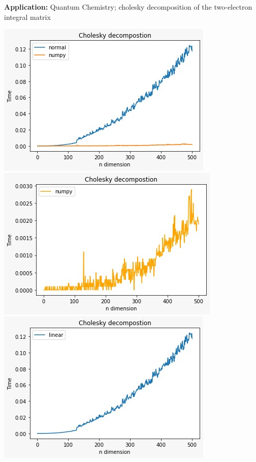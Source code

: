 \documentclass[]{finalproject}
\begin{document}
\begin{flushleft}
\textbf{Application:} Quantum Chemistry; cholesky decomposition of the two-electron integral matrix \cite{cholesky_application} \newline

\includegraphics[width=0.3\linewidth]{cholesky_both.jpeg} \qquad \includegraphics[width=0.3\linewidth]{cholesky_numpy.jpeg} \qquad \includegraphics[width=0.3\linewidth]{cholesky_custom.jpeg}


\end{flushleft}
\end{document}
